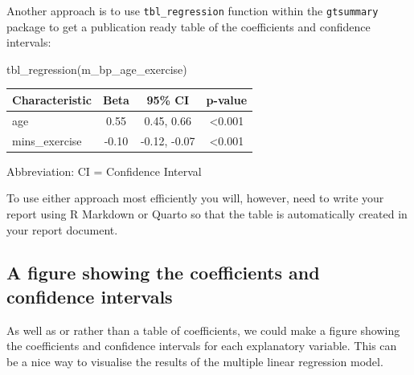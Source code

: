 \documentclass[
  letterpaper,
  8pt,
  a4paper]{book}
\newenvironment{Shaded}{\begin{snugshade}}{\end{snugshade}}
\newcommand{\FunctionTok}[1]{\textcolor[rgb]{0.28,0.35,0.67}{#1}}
\newcommand{\NormalTok}[1]{\textcolor[rgb]{0.00,0.23,0.31}{#1}}
\begin{document}
Another approach is to use \texttt{tbl\_regression} function within the
\texttt{gtsummary} package to get a publication ready table of the
coefficients and confidence intervals:

\begin{Shaded}
\begin{Highlighting}[]
\FunctionTok{tbl\_regression}\NormalTok{(m\_bp\_age\_exercise)}
\end{Highlighting}
\end{Shaded}

\begin{table}
\fontsize{12.0pt}{14.0pt}\selectfont
\begin{tabular*}{\linewidth}{@{\extracolsep{\fill}}lccc}
\toprule
\textbf{Characteristic} & \textbf{Beta} & \textbf{95\% CI} & \textbf{p-value} \\ 
\midrule\addlinespace[2.5pt]
age & 0.55 & 0.45, 0.66 & <0.001 \\ 
mins\_exercise & -0.10 & -0.12, -0.07 & <0.001 \\ 
\bottomrule
\end{tabular*}
\begin{minipage}{\linewidth}
\vspace{.05em}
Abbreviation: CI = Confidence Interval\\
\end{minipage}
\end{table}

To use either approach most efficiently you will, however, need to write
your report using R Markdown or Quarto so that the table is
automatically created in your report document.

\subsection*{A figure showing the coefficients and confidence
intervals}\label{a-figure-showing-the-coefficients-and-confidence-intervals}

As well as or rather than a table of coefficients, we could make a
figure showing the coefficients and confidence intervals for each
explanatory variable. This can be a nice way to visualise the results of
the multiple linear regression model.
\end{document}

